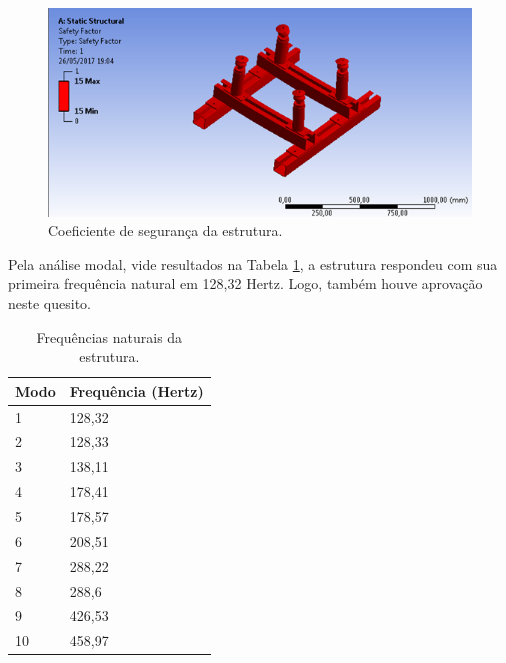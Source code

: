 \begin{figure}[h!]
	\centering
	\includegraphics[keepaspectratio=true,scale= 0.8]{figuras/coeficiente-estrutura.png}
	\caption{Coeficiente de segurança da estrutura.}
	\label{fig:coeficienteestrutura}
\end{figure}

\pagebreak

 Pela análise modal, vide resultados na Tabela \ref{tab:frequencias}, a estrutura respondeu com sua primeira frequência natural em 128,32 Hertz. Logo, também houve aprovação neste quesito.


\begin{table}[!h]
\centering
\caption{Frequências naturais da estrutura.}
\label{tab:frequencias}
\begin{tabular}{|l|l|}
\hline
\multicolumn{1}{|c|}{\textbf{Modo}}    & \multicolumn{1}{c|}{\textbf{Frequência (Hertz)}} \\ \hline
1        					   & 128,32          \\ \hline
2       					   & 128,33         \\ \hline
3            				   & 138,11          \\ \hline
4        					   & 178,41          \\ \hline
5       					   & 178,57          \\ \hline
6            				   & 208,51          \\ \hline
7       					   & 288,22          \\ \hline
8            				   & 288,6          \\ \hline
9       					   & 426,53         \\ \hline
10           				   & 458,97          \\ \hline
\end{tabular}
\end{table}